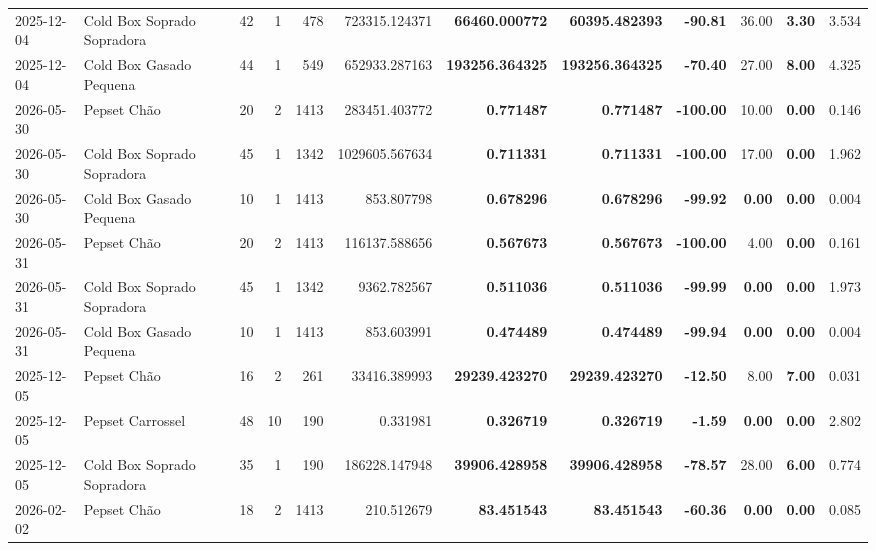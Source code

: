 {\begin{center}
{\begin{tabular}{@{}llrrrrrrrrrr@{}}
2025-12-04 & Cold Box Soprado Sopradora & 42 & 1 & 478 & 723315.124371 & \textbf{66460.000772} & \textbf{60395.482393} & \textbf{-90.81} & 36.00 & \textbf{3.30} & 3.534 \\
2025-12-04 & Cold Box Gasado Pequena & 44 & 1 & 549 & 652933.287163 & \textbf{193256.364325} & \textbf{193256.364325} & \textbf{-70.40} & 27.00 & \textbf{8.00} & 4.325 \\
2026-05-30 & Pepset Chão & 20 & 2 & 1413 & 283451.403772 & \textbf{0.771487} & \textbf{0.771487} & \textbf{-100.00} & 10.00 & \textbf{0.00} & 0.146 \\
2026-05-30 & Cold Box Soprado Sopradora & 45 & 1 & 1342 & 1029605.567634 & \textbf{0.711331} & \textbf{0.711331} & \textbf{-100.00} & 17.00 & \textbf{0.00} & 1.962 \\
2026-05-30 & Cold Box Gasado Pequena & 10 & 1 & 1413 & 853.807798 & \textbf{0.678296} & \textbf{0.678296} & \textbf{-99.92} & \textbf{0.00} & \textbf{0.00} & 0.004 \\
2026-05-31 & Pepset Chão & 20 & 2 & 1413 & 116137.588656 & \textbf{0.567673} & \textbf{0.567673} & \textbf{-100.00} & 4.00 & \textbf{0.00} & 0.161 \\
2026-05-31 & Cold Box Soprado Sopradora & 45 & 1 & 1342 & 9362.782567 & \textbf{0.511036} & \textbf{0.511036} & \textbf{-99.99} & \textbf{0.00} & \textbf{0.00} & 1.973 \\
2026-05-31 & Cold Box Gasado Pequena & 10 & 1 & 1413 & 853.603991 & \textbf{0.474489} & \textbf{0.474489} & \textbf{-99.94} & \textbf{0.00} & \textbf{0.00} & 0.004 \\
2025-12-05 & Pepset Chão & 16 & 2 & 261 & 33416.389993 & \textbf{29239.423270} & \textbf{29239.423270} & \textbf{-12.50} & 8.00 & \textbf{7.00} & 0.031 \\
2025-12-05 & Pepset Carrossel & 48 & 10 & 190 & 0.331981 & \textbf{0.326719} & \textbf{0.326719} & \textbf{-1.59} & \textbf{0.00} & \textbf{0.00} & 2.802 \\
2025-12-05 & Cold Box Soprado Sopradora & 35 & 1 & 190 & 186228.147948 & \textbf{39906.428958} & \textbf{39906.428958} & \textbf{-78.57} & 28.00 & \textbf{6.00} & 0.774 \\
2026-02-02 & Pepset Chão & 18 & 2 & 1413 & 210.512679 & \textbf{83.451543} & \textbf{83.451543} & \textbf{-60.36} & \textbf{0.00} & \textbf{0.00} & 0.085 \\
\bottomrule
\end{tabular}%
}
\end{center}
}
\vspace*{\fill}
